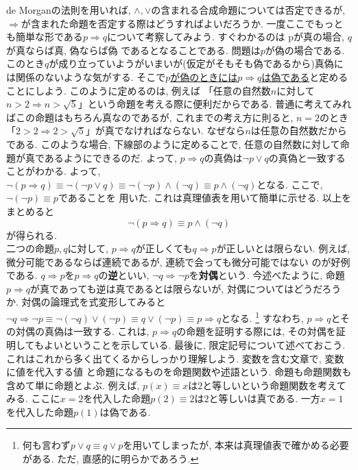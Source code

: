 \documentclass[a4j,dvipdfmx]{jsarticle}
\numberwithin{equation}{section}
\begin{document}
            de Morganの法則を用いれば, $\land,\lor$の含まれる合成命題については否定できるが, $\Rightarrow$が含まれた命題を否定する際はどうすればよいだろうか.
            一度ここでもっとも簡単な形である$p \Rightarrow q$について考察してみよう. すぐわかるのは pが真の場合, $q$が真ならば真, 偽ならば偽
            であるとなることである. 問題は$p$が偽の場合である. このとき$q$が成り立っていようがいまいが(仮定がそもそも偽であるから)真偽には関係のないような気がする.
            そこで\underline{$p$が偽のときには$p\Rightarrow q$は偽である}と定めることにしよう. このように定めるのは, 例えば
            「任意の自然数$n$に対して$n>2\Rightarrow n > \sqrt{5}$」という命題を考える際に便利だからである. 普通に考えてみればこの命題はもちろん真なのであるが, 
            これまでの考え方に則ると, $n=2$のとき「$2>2\Rightarrow 2>\sqrt{5}$」が真でなければならない. なぜなら$n$は\.{任}\.{意}\.{の}自然数だからである. このような場合, 
            下線部のように定めることで, 任意の自然数に対して命題が真であるようにできるのだ. よって, $p\Rightarrow q$の真偽は$\lnot p\lor q$の真偽と一致することがわかる.
            よって, $\lnot (p\Rightarrow q)\equiv \lnot (\lnot p\lor q)\equiv \lnot(\lnot p) \land (\lnot q)\equiv p\land (\lnot q)$となる. ここで, $\lnot (\lnot p)\equiv p$であることを
            用いた. これは真理値表を用いて簡単に示せる.
            以上をまとめると
            \begin{equation}
                \lnot (p \Rightarrow q) \equiv p \land (\lnot q) \label{eq:集合論基礎:ならばの否定}
            \end{equation}
            が得られる. \\

            二つの命題$p,q$に対して, $p\Rightarrow q$が正しくても$q\Rightarrow p$が正しいとは限らない. 例えば, 微分可能であるならば連続であるが, 連続で会っても微分可能ではない
            のが好例である.  $q\Rightarrow p$を$p\Rightarrow q$の\textbf{逆}といい, $\lnot q\Rightarrow \lnot p$を\textbf{対偶}という.
            今述べたように, 命題$p\Rightarrow q$が真であっても逆は真であるとは限らないが, 対偶についてはどうだろうか. 対偶の論理式を式変形してみると
            $\lnot q\Rightarrow \lnot p\equiv \lnot (\lnot q) \lor (\lnot p) \equiv q \lor (\lnot p)\equiv p \Rightarrow q$となる. \footnote{何も言わず$p\lor q \equiv q \lor p$を用いてしまったが, 本来は真理値表で確かめる必要がある. ただ, 直感的に明らかであろう.}
            すなわち, $p \Rightarrow q$とその対偶の真偽は一致する. これは, $p \Rightarrow q$の命題を証明する際には, その対偶を証明してもよいということを示している.
            \clearpage
            最後に, 限定記号について述べておこう. これはこれから多く出てくるからしっかり理解しよう. 変数を含む文章で, 変数に値を代入する値
            と命題になるものを命題関数や述語という. 命題も命題関数も含めて単に命題とよぶ. 例えば, $p(x)\equiv\text{$x$は2と等しい}$という命題関数を考えてみる. ここに$x=2$を代入した命題$p(2)\equiv\text{$2$は2と等しい}$は真である.
            一方$x=1$を代入した命題$p(1)$は偽である.\\
\end{document}
